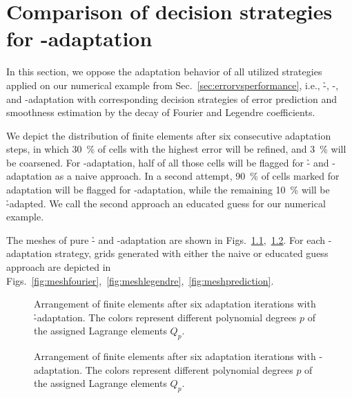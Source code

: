 \chapter{Comparison of decision strategies for \hp-adaptation}
\label{app::strategies}
\glsresetall

In this section, we oppose the adaptation behavior of all utilized strategies applied on our numerical example from Sec.~\ref{sec:errorvsperformance}, i.e., \h-, \p-, and \hp-adaptation with corresponding decision strategies of error prediction and smoothness estimation by the decay of Fourier and Legendre coefficients.

We depict the distribution of finite elements after six consecutive adaptation steps, in which \SI{30}{\percent} of cells with the highest error will be refined, and \SI{3}{\percent} will be coarsened. For \hp-adaptation, half of all those cells will be flagged for \h- and \p-adaptation as a naive approach. In a second attempt, \SI{90}{\percent} of cells marked for adaptation will be flagged for \p-adaptation, while the remaining \SI{10}{\percent} will be \h-adapted. We call the second approach an educated guess for our numerical example.

The meshes of pure \h- and \p-adaptation are shown in Figs.~\ref{fig:meshh},~\ref{fig:meshp}. For each \hp-adaptation strategy, grids generated with either the naive or educated guess approach are depicted in Figs.~\ref{fig:meshfourier},~\ref{fig:meshlegendre},~\ref{fig:meshprediction}.


\begin{figure}
\centering

\caption[Arrangement of finite elements with \h-adaptation.]{Arrangement of finite elements after six adaptation iterations with \h-adaptation. The colors represent different polynomial degrees $p$ of the assigned Lagrange elements $Q_p$.}
\label{fig:meshh}
\end{figure}

\begin{figure}
\centering

\caption[Arrangement of finite elements with \p-adaptation.]{Arrangement of finite elements after six adaptation iterations with \p-adaptation. The colors represent different polynomial degrees $p$ of the assigned Lagrange elements $Q_p$.}
\label{fig:meshp}
\end{figure}


